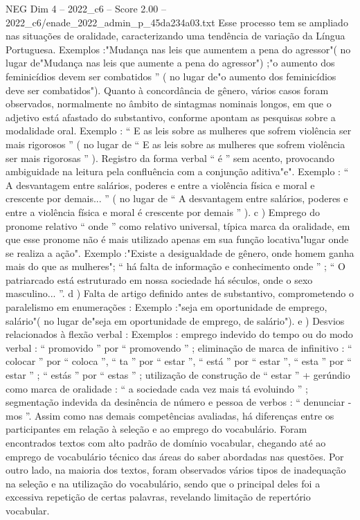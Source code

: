 \begin{textsample}{NEG Dim 4 – 2022\_c6 – Score 2.00 – 2022\_c6/enade\_2022\_admin\_p\_45da234a03.txt}
Esse processo tem se ampliado nas situações de oralidade, caracterizando uma tendência de variação da Língua Portuguesa.
Exemplos :"Mudança nas leis que aumentem a pena do agressor"( no lugar de"Mudança nas leis que aumente a pena do agressor") ;"o aumento dos feminicídios devem ser combatidos ” ( no lugar de"o aumento dos feminicídios deve ser combatidos").
Quanto à concordância de gênero, vários casos foram observados, normalmente no âmbito de sintagmas nominais longos, em que o adjetivo está afastado do substantivo, conforme apontam as pesquisas sobre a modalidade oral.
Exemplo : “ E as leis sobre as mulheres que sofrem violência ser mais rigorosos ” ( no lugar de “ E as leis sobre as mulheres que sofrem violência ser mais rigorosas ” ).
Registro da forma verbal “ é ” sem acento, provocando ambiguidade na leitura pela confluência com a conjunção aditiva"e".
Exemplo : “ A desvantagem entre salários, poderes e entre a violência física e moral e crescente por demais... ” ( no lugar de “ A desvantagem entre salários, poderes e entre a violência física e moral é crescente por demais ” ). c ) Emprego do pronome relativo “ onde ” como relativo universal, típica marca da oralidade, em que esse pronome não é mais utilizado apenas em sua função locativa"lugar onde se realiza a ação".
Exemplo :"Existe a desigualdade de gênero, onde homem ganha mais do que as mulheres"; “ há falta de informação e conhecimento onde ” ; “ O patriarcado está estruturado em nossa sociedade há séculos, onde o sexo masculino... ”. d ) Falta de artigo definido antes de substantivo, comprometendo o paralelismo em enumerações : Exemplo :"seja em oportunidade de emprego, salário"( no lugar de"seja em oportunidade de emprego, de salário"). e ) Desvios relacionados à flexão verbal : Exemplos : emprego indevido do tempo ou do modo verbal : “ promovido ” por “ promovendo ” ; eliminação de marca de infinitivo : “ colocar ” por “ coloca ”, “ ta ” por “ estar ”, “ está ” por “ estar ”, “ esta ” por “ estar ” ; “ estás ” por “ estas ” ; utilização de construção de “ estar ” + gerúndio como marca de oralidade : “ a sociedade cada vez mais tá evoluindo ” ; segmentação indevida da desinência de número e pessoa de verbos : “ denunciar -mos ”.
Assim como nas demais competências avaliadas, há diferenças entre os participantes em relação à seleção e ao emprego do vocabulário.
Foram encontrados textos com alto padrão de domínio vocabular, chegando até ao emprego de vocabulário técnico das áreas do saber abordadas nas questões.
Por outro lado, na maioria dos textos, foram observados vários tipos de inadequação na seleção e na utilização do vocabulário, sendo que o principal deles foi a excessiva repetição de certas palavras, revelando limitação de repertório vocabular.

\end{textsample}

